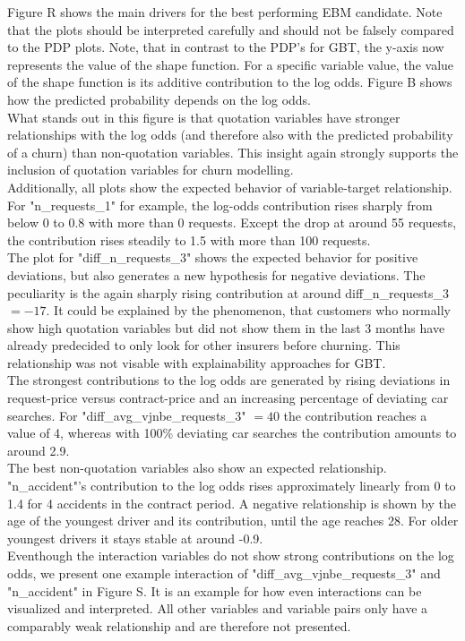 \documentclass[12pt,titlepage]{article}
\begin{document}
Figure R shows the main drivers for the best performing EBM candidate. Note that the plots should be interpreted carefully and should not be falsely compared to the PDP plots. Note, that in contrast to the PDP's for GBT, the y-axis now represents the value of the shape function. For a specific variable value, the value of the shape function is its additive contribution to the log odds. Figure B shows how the predicted probability depends on the log odds. \\
What stands out in this figure is that quotation variables have stronger relationships with the log odds (and therefore also with the predicted probability of a churn) than non-quotation variables. This insight again strongly supports the inclusion of quotation variables for churn modelling. \\
Additionally, all plots show the expected behavior of variable-target relationship. For "n\_requests\_1" for example, the log-odds contribution rises sharply from below 0 to 0.8 with more than 0 requests. Except the drop at around 55 requests, the contribution rises steadily to 1.5 with more than 100 requests. \\
The plot for "diff\_n\_requests\_3" shows the expected behavior for positive deviations, but also generates a new hypothesis for negative deviations. The peculiarity is the again sharply rising contribution at around diff\_n\_requests\_3 $=-17$. It could be explained by the phenomenon, that customers who normally show high quotation variables but did not show them in the last 3 months have already predecided to only look for other insurers before churning. This relationship was not visable with explainability approaches for GBT. \\
The strongest contributions to the log odds are generated by rising deviations in request-price versus contract-price and an increasing percentage of deviating car searches. For "diff\_avg\_vjnbe\_requests\_3" $=40$ the contribution reaches a value of 4, whereas with 100\% deviating car searches the contribution amounts to around 2.9. \\
The best non-quotation variables also show an expected relationship. "n\_accident"'s contribution to the log odds rises approximately linearly from 0 to 1.4 for 4 accidents in the contract period. A negative relationship is shown by the age of the youngest driver and its contribution, until the age reaches 28. For older youngest drivers it stays stable at around -0.9. \\
Eventhough the interaction variables do not show strong contributions on the log odds, we present one example interaction of "diff\_avg\_vjnbe\_requests\_3" and "n\_accident" in Figure S. It is an example for how even interactions can be visualized and interpreted. All other variables and variable pairs only have a comparably weak relationship and are therefore not presented. \\
\end{document}
